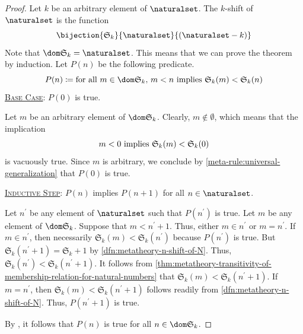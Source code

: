 \begin{proof}
    Let \( k \) be an arbitrary element of \( \naturalset \).
    The \( k \)-shift of \( \naturalset \) is the function
    \begin{equation*}
        \bijection{\mathfrak{S}_{k}}{\naturalset}{\mleft( \naturalset - k \mright)}
    \end{equation*}
    Note that \( \dom \mathfrak{S}_{k} = \naturalset \).
    This means that we can prove the theorem by induction.
    Let \( P(n) \) be the following predicate.
    \begin{equation*}
        P(n) \coloneq \text{for all \( m \in \dom \mathfrak{S}_{k} \), \( m < n \) implies \( \mathfrak{S}_{k}(m) < \mathfrak{S}_{k}(n) \)}
    \end{equation*}
    \underline{\scshape Base Case}: \( P(0) \) is true.

    \vspace{0.3cm}
    \noindent
    Let \( m \) be an arbitrary element of \( \dom \mathfrak{S}_{k} \).
    Clearly, \( m \notin \emptyset \), which means that the implication
    \begin{equation*}
        \text{\( m < 0 \) implies \( \mathfrak{S}_{k}(m) < \mathfrak{S}_{k}(0) \)}
    \end{equation*}
    is vacuously true.
    Since \( m \) is arbitrary, we conclude by \cref{meta-rule:universal-generalization} that \( P(0) \) is true.

    \vspace{0.3cm}
    \noindent
    \underline{\scshape Inductive Step}: \( P(n) \) implies \( P(n + 1) \) for all \( n \in \naturalset \).

    \vspace{0.3cm}
    \noindent
    Let \( n^{\prime} \) be any element of \( \naturalset \) such that \( P(n^{\prime}) \) is true.
    Let \( m \) be any element of \( \dom \mathfrak{S}_{k} \).
    Suppose that \( m < n^{\prime} + 1 \).
    Thus, either \( m \in n^{\prime} \) or \( m = n^{\prime} \).
    If \( m \in n^{\prime} \), then necessarily \( \mathfrak{S}_{k}(m) < \mathfrak{S}_{k}(n^{\prime}) \)
    because \( P(n^{\prime}) \) is true.
    But \( \mathfrak{S}_{k}(n^{\prime} + 1) = \mathfrak{S}_{k} + 1 \) by \cref{dfn:metatheory-n-shift-of-N}.
    Thus, \( \mathfrak{S}_{k}(n^{\prime}) < \mathfrak{S}_{k}(n^{\prime} + 1)  \).
    It follows from \cref{thm:metatheory-transitivity-of-membership-relation-for-natural-numbers} that
    \( \mathfrak{S}_{k}(m) < \mathfrak{S}_{k}(n^{\prime} + 1) \).
    If \( m = n^{\prime} \), then \( \mathfrak{S}_{k}(m) < \mathfrak{S}_{k}(n^{\prime} + 1) \) follows readily from
    \cref{dfn:metatheory-n-shift-of-N}.
    Thus, \( P(n^{\prime} + 1) \) is true.

    \vspace{0.3cm}
    \noindent
    By , it follows that \( P(n) \) is true for all \( n \in \dom \mathfrak{S}_{k} \).
\end{proof}

